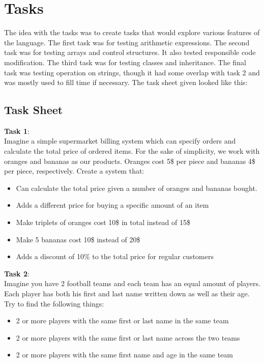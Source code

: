 \section{Tasks}
The idea with the tasks was to create tasks that would explore various features of the language.
The first task was for testing arithmetic expressions.
The second task was for testing arrays and control structures.
It also tested responsible code modification.%
The third task was for testing classes and inheritance.
The final task was testing operation on strings, though it had some overlap with task 2 and was mostly used to fill time if necessary.
The task sheet given looked like this:%

\subsection{Task Sheet}
\textbf{Task 1}:\\
Imagine a simple supermarket billing system which can specify orders and calculate the total price of ordered items. For the sake of simplicity, we work with oranges and bananas as our products. Oranges cost 5\$ per piece and bananas 4\$ per piece, respectively. Create a system that:
\begin{itemize}
\item Can calculate the total price given a number of oranges and bananas bought.
\item Adds a different price for buying a specific amount of an item 
\item Make triplets of oranges cost 10\$ in total instead of 15\$
\item Make 5 bananas cost 10\$ instead of 20\$
\item Adds a discount of 10\% to the total price for regular customers
\end{itemize}

\textbf{Task 2}:\\
Imagine you have 2 football teams and each team has an equal amount of players. Each player has both his first and last name written down as well as their age. Try to find the following things:
\begin{itemize}
\item 2 or more players with the same first or last name in the same team
\item 2 or more players with the same first or last name across the two teams
\item 2 or more players with the same first name and age in the same team
\end{itemize}

